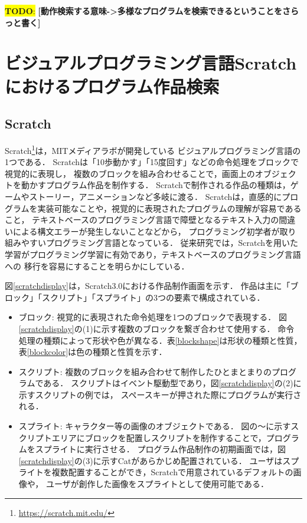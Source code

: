 \documentclass[11pt]{jreport}
\newcommand{\todo}[1]{\colorbox{yellow}{{\bf TODO}:}{\color{red} {\textbf{[#1]}}}}
\begin{document}
\todo{動作検索する意味->多様なプログラムを検索できるということをさらっと書く}


\chapter{ビジュアルプログラミング言語Scratchにおけるプログラム作品検索}

\section{Scratch}
Scratch\footnote{ \url{https://scratch.mit.edu/}}は，MITメディアラボが開発している
ビジュアルプログラミング言語の1つである．
Scratchは「10歩動かす」「15度回す」などの命令処理をブロックで視覚的に表現し，
複数のブロックを組み合わせることで，画面上のオブジェクトを動かすプログラム作品を制作する．
Scratchで制作される作品の種類は，ゲームやストーリー，アニメーションなど多岐に渡る\cite{wild}．
Scratchは，直感的にプログラムを実装可能なことや，視覚的に表現されたプログラムの理解が容易であること，
テキストベースのプログラミング言語で障壁となるテキスト入力の間違いによる構文エラーが発生しないことなどから，
プログラミング初学者が取り組みやすいプログラミング言語となっている．
従来研究では，Scratchを用いた学習がプログラミング学習に有効であり，テキストベースのプログラミング言語への
移行を容易にすることを明らかにしている\cite{blocktotext}\cite{blockandbeyond}．

図\ref{scratchdisplay}は，Scratch3.0における作品制作画面を示す．
作品は主に「ブロック」「スクリプト」「スプライト」の3つの要素で構成されている．

\begin{itemize}
    \item ブロック: 視覚的に表現された命令処理を1つのブロックで表現する．
    図\ref{scratchdisplay}の(1)に示す複数のブロックを繋ぎ合わせて使用する．
    命令処理の種類によって形状や色が異なる．表\ref{blockshape}は形状の種類と性質，
    表\ref{blockcolor}は色の種類と性質を示す．
    \item スクリプト: 複数のブロックを組み合わせて制作したひとまとまりのプログラムである．
    スクリプトはイベント駆動型であり，図\ref{scratchdisplay}の(2)に示すスクリプトの例では，
    スペースキーが押された際にプログラムが実行される．
    \item スプライト: キャラクター等の画像のオブジェクトである．
    図の〜に示すスクリプトエリアにブロックを配置しスクリプトを制作することで，プログラムをスプライトに実行させる．
    プログラム作品制作の初期画面では，図\ref{scratchdisplay}の(3)に示すCatがあらかじめ配置されている．
    ユーザはスプライトを複数配置することができ，Scratchで用意されているデフォルトの画像や，
    ユーザが創作した画像をスプライトとして使用可能である．
\end{itemize}
\end{document}
